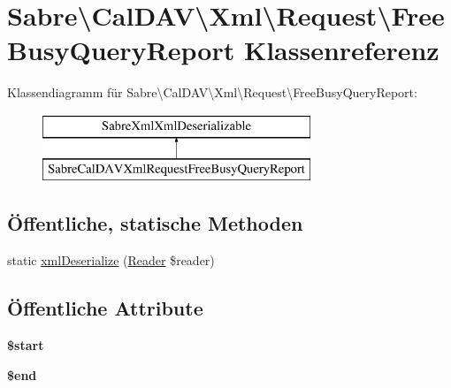 \hypertarget{class_sabre_1_1_cal_d_a_v_1_1_xml_1_1_request_1_1_free_busy_query_report}{}\section{Sabre\textbackslash{}Cal\+D\+AV\textbackslash{}Xml\textbackslash{}Request\textbackslash{}Free\+Busy\+Query\+Report Klassenreferenz}
\label{class_sabre_1_1_cal_d_a_v_1_1_xml_1_1_request_1_1_free_busy_query_report}
Klassendiagramm für Sabre\textbackslash{}Cal\+D\+AV\textbackslash{}Xml\textbackslash{}Request\textbackslash{}Free\+Busy\+Query\+Report\+:\begin{figure}[H]
\begin{center}
\leavevmode
\includegraphics[height=2.000000cm]{class_sabre_1_1_cal_d_a_v_1_1_xml_1_1_request_1_1_free_busy_query_report}
\end{center}
\end{figure}
\subsection*{Öffentliche, statische Methoden}
\begin{DoxyCompactItemize}
\item 
static \mbox{\hyperlink{class_sabre_1_1_cal_d_a_v_1_1_xml_1_1_request_1_1_free_busy_query_report_a31f443d1f4d3e0a0e853f2079a76307f}{xml\+Deserialize}} (\mbox{\hyperlink{class_sabre_1_1_xml_1_1_reader}{Reader}} \$reader)
\end{DoxyCompactItemize}
\subsection*{Öffentliche Attribute}
\begin{DoxyCompactItemize}
\item 
\mbox{\label{class_sabre_1_1_cal_d_a_v_1_1_xml_1_1_request_1_1_free_busy_query_report_a0b0c856c9343a290ff55eb0399b49651}} 
{\bfseries \$start}
\item 
\mbox{\label{class_sabre_1_1_cal_d_a_v_1_1_xml_1_1_request_1_1_free_busy_query_report_a3008d46eb181bb5017588960fe8238ae}} 
{\bfseries \$end}
\end{DoxyCompactItemize}


